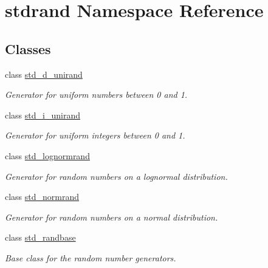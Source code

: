 \hypertarget{namespacestdrand}{}\section{stdrand Namespace Reference}
\label{namespacestdrand}
\subsection*{Classes}
\begin{DoxyCompactItemize}
\item 
class \hyperlink{classstdrand_1_1std__d__unirand}{std\+\_\+d\+\_\+unirand}
\begin{DoxyCompactList}\small\item\em Generator for uniform numbers between 0 and 1. \end{DoxyCompactList}\item 
class \hyperlink{classstdrand_1_1std__i__unirand}{std\+\_\+i\+\_\+unirand}
\begin{DoxyCompactList}\small\item\em Generator for uniform integers between 0 and 1. \end{DoxyCompactList}\item 
class \hyperlink{classstdrand_1_1std__lognormrand}{std\+\_\+lognormrand}
\begin{DoxyCompactList}\small\item\em Generator for random numbers on a lognormal distribution. \end{DoxyCompactList}\item 
class \hyperlink{classstdrand_1_1std__normrand}{std\+\_\+normrand}
\begin{DoxyCompactList}\small\item\em Generator for random numbers on a normal distribution. \end{DoxyCompactList}\item 
class \hyperlink{classstdrand_1_1std__randbase}{std\+\_\+randbase}
\begin{DoxyCompactList}\small\item\em Base class for the random number generators. \end{DoxyCompactList}\end{DoxyCompactItemize}
